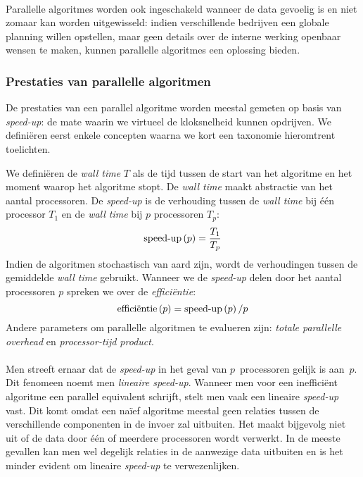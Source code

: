 \paragraph{}
Parallelle algoritmes worden ook ingeschakeld wanneer de data gevoelig is en niet zomaar kan worden uitgewisseld: indien verschillende bedrijven een globale planning willen opstellen, maar geen details over de interne werking openbaar wensen te maken, kunnen parallelle algoritmes een oplossing bieden\cite{Gaspero_amultiagent}.

\subsubsection{Prestaties van parallelle algoritmen}

De prestaties van een parallel algoritme worden meestal gemeten op basis van \emph{speed-up}: de mate waarin we virtueel de kloksnelheid kunnen opdrijven. We defini\"eren eerst enkele concepten waarna we kort een taxonomie hieromtrent toelichten.

\begin{definition}
We defini\"eren de \emph{wall time} $T$ als de tijd tussen de start van het algoritme en het moment waarop het algoritme stopt. De \emph{wall time} maakt abstractie van het aantal processoren. De \emph{speed-up} is de verhouding tussen de \emph{wall time} bij \'e\'en processor $T_1$ en de \emph{wall time} bij $p$ processoren $T_p$:
\begin{equation}
\mbox{speed-up}\left(p\right)=\displaystyle\frac{T_1}{T_p}
\end{equation}
Indien de algoritmen stochastisch van aard zijn, wordt de verhoudingen tussen de gemiddelde \emph{wall time} gebruikt.
Wanneer we de \emph{speed-up} delen door het aantal processoren $p$ spreken we over de \emph{effici\"entie}:
\begin{equation}
\mbox{effici\"entie}\left(p\right)=\mbox{speed-up}\left(p\right)/p
\end{equation}
Andere parameters om parallelle algoritmen te evalueren zijn: \emph{totale parallelle overhead} en \emph{processor-tijd product}\cite{books/bc/KumarGGK94}.
\end{definition}

\paragraph{}
Men streeft ernaar dat de \emph{speed-up} in het geval van $p$~processoren gelijk is aan~$p$. Dit fenomeen noemt men \emph{lineaire speed-up}. Wanneer men voor een ineffici\"ent algoritme een parallel equivalent schrijft, stelt men vaak een lineaire \emph{speed-up} vast. Dit komt omdat een na\"ief algoritme meestal geen relaties tussen de verschillende componenten in de invoer zal uitbuiten. Het maakt bijgevolg niet uit of de data door \'e\'en of meerdere processoren wordt verwerkt. In de meeste gevallen kan men wel degelijk relaties in de aanwezige data uitbuiten en is het minder evident om lineaire \emph{speed-up} te verwezenlijken.

